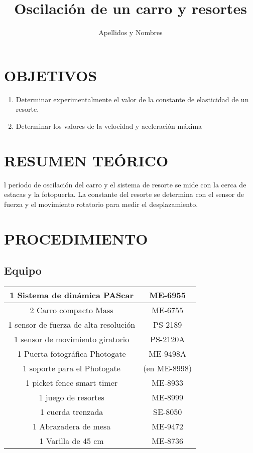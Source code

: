 \documentclass[9pt,a4paper,twocolumn,twoside]{tau-class/tau}
\title{Oscilación de un carro y resortes}
\author[a,1]{Apellidos y Nombres}
\affil[a]{\textbf{Código:} 182739}
\affil[a]{\textbf{Curso:} Física - II}
\begin{document}
		
    \maketitle 
    \thispagestyle{firststyle} 
    \tauabstract 
    

\section{OBJETIVOS}
    \begin{enumerate}
        \item Determinar experimentalmente el valor de la constante de elasticidad de un resorte.
        \item Determinar los valores de la velocidad y aceleración máxima
    \end{enumerate}
    
\section{RESUMEN TEÓRICO}
    l período de oscilación del carro y el sistema de resorte se mide con la cerca de estacas y la fotopuerta. La constante del resorte se determina con el sensor de fuerza y el movimiento rotatorio para medir el desplazamiento.
    
\section{PROCEDIMIENTO}
\subsection{Equipo}
\begin{tabular}{|c|c|}
     \hline
     1 Sistema de dinámica PAScar &  ME-6955\\ \hline
     2 Carro compacto Mass & ME-6755\\  \hline
     1 sensor de fuerza de alta resolución & PS-2189\\ \hline
     1 sensor de movimiento giratorio & PS-2120A\\ \hline
     1 Puerta fotográfica Photogate & ME-9498A\\ \hline
     1 soporte para el Photogate  & (en ME-8998) \\ \hline
     1 picket fence smart timer & ME-8933\\ \hline
     1 juego de resortes & ME-8999 \\ \hline
     1 cuerda trenzada & SE-8050 \\ \hline
     1 Abrazadera de mesa & ME-9472\\ \hline
     1 Varilla de 45 cm & ME-8736\\ \hline
\end{tabular}
\end{document}
